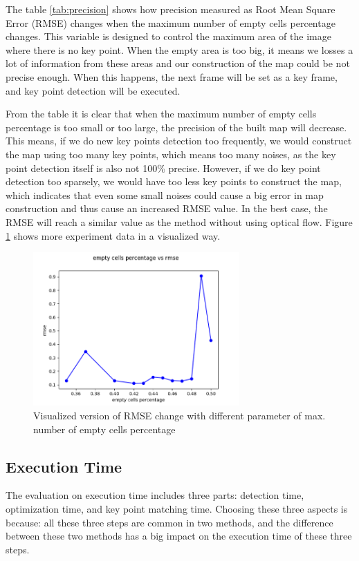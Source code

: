 \documentclass{easychair}
\begin{document}
The table \ref{tab:precision} shows how precision measured as Root Mean Square Error (RMSE) changes when the maximum number of empty cells percentage changes. This variable is designed to control the maximum area of the image where there is no key point. When the empty area is too big, it means we losses a lot of information from these areas and our construction of the map could be not precise enough. When this happens, the next frame will be set as a key frame, and key point detection will be executed. 

From the table it is clear that when the maximum number of empty cells percentage is too small or too large, the precision of the built map will decrease. This means, if we do new key points detection too frequently, we would construct the map using too many key points, which means too many noises, as the key point detection itself is also not 100\% precise. However, if we do key point detection too sparsely, we would have too less key points to construct the map, which indicates that even some small noises could cause a big error in map construction and thus cause an increased RMSE value. In the best case, the RMSE will reach a similar value as the method without using optical flow. Figure \ref{fig:max_empty_cell} shows more experiment data in a visualized way.

\begin{figure}
	
	\centering
	\includegraphics[width=0.7\textwidth]{img/max_num_empty_cell1.png}
	\caption{Visualized version of RMSE change with different parameter of max. number of empty cells percentage}
	\label{fig:max_empty_cell}
	
\end{figure}


\subsection{Execution Time}
The evaluation on execution time includes three parts: detection time, optimization time, and key point matching time. Choosing these three aspects is because: all these three steps are common in two methods, and the difference between these two methods has a big impact on the execution time of these three steps.
\end{document}
